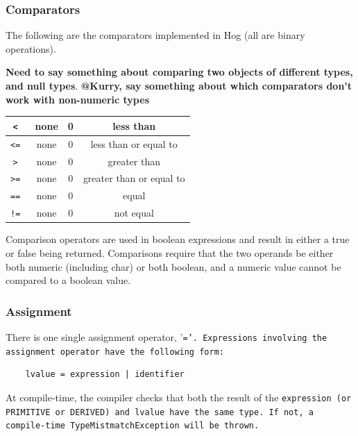 \documentclass{article}
\begin{document}

\subsubsection{Comparators} %
\label{ssub:comparators}

The following are the comparators implemented in Hog (all are binary operations).

\textbf{Need to say something about comparing two objects of different types, and
null types}. \textbf{@Kurry, say something about which comparators don't work with non-numeric types}

\begin{center}
\begin{tabular}{|c|c|c|c|}

\hline
\tt < \rm & none & 0 & less than \\ \hline
\tt <= \rm & none & 0 & less than or equal to \\ \hline
\tt > \rm & none & 0 & greater than \\ \hline
\tt >= \rm & none & 0 & greater than or equal to \\ \hline
\tt == \rm & none & 0 & equal \\ \hline
\tt != \rm & none & 0 & not equal \\ \hline

\end{tabular}
\end{center}

Comparison operators are used in boolean expressions and result in either 
a true or false being returned. Comparisons require that the two operands 
be either both numeric (including char) or both boolean, and a numeric value
cannot be compared to a boolean value.


\subsubsection{Assignment} %
\label{ssub:assignment}

There is one single assignment operator, '\tt =\rm'. Expressions involving the
assignment operator have the following form:

\begin{verbatim}
    lvalue = expression | identifier
\end{verbatim}

At compile-time, the compiler checks that both the result of the \tt expression \rm
(or \tt PRIMITIVE \rm or \tt DERIVED\rm) and \tt lvalue \rm have the same type. If
not, a compile-time \tt TypeMistmatchException \rm will be thrown.
\end{document}
